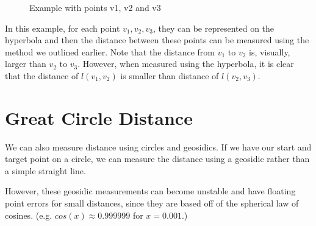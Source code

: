 \documentclass[12pt,a4paper]{report}
\begin{document}
\begin{figure}
\caption{Example with points v1, v2 and v3}
\end{figure}

In this example, for each point $v_{1}, v_{2}, v_{3}$, they can be represented on the hyperbola and then the distance between these points can be measured using the method we outlined earlier. Note that the distance from $v_{1}$ to $v_{2}$ is, visually, larger than $v_{2}$ to $v_{3}$. However, when measured using the hyperbola, it is clear that the distance of $l(v_{1}, v_{2})$ is smaller than distance of $l(v_{2}, v_{3})$.


\section{Great Circle Distance}
We can also measure distance using circles and geosidics. If we have our start and target point on a circle, we can measure the distance using a geosidic rather than a simple straight line.

However, these geosidic measurements can become unstable and have floating point errors for small distances, since they are based off of the spherical law of cosines. (e.g. $cos(x) \approx 0.999999$ for $x = 0.001$.)

\end{document}
